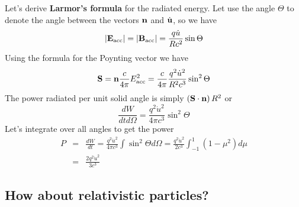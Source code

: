 Let's derive {\bf Larmor's formula} for the radiated energy.  Let use
the angle $\Theta$ to denote the angle between the vectors ${\bf n}$
and $\dot{{\bf u}}$, so we have
\begin{equation}
|{\bf E}_{\hbox{\rm \scriptsize acc}}| = |{\bf B}_{\hbox{\rm \scriptsize acc}}| = \frac{q \dot{u}}{Rc^2}
\sin \Theta
\label{eq:207}
\end{equation}
Using the formula for the Poynting vector we have
\begin{equation}
{\bf S} = {\bf n} \frac{c}{4\pi} E_{\hbox{\rm \scriptsize acc}}^2 = \frac{c}{4\pi}
\frac{q^2 \dot{u}^2}{R^2 c^3} \sin^2 \Theta
\label{eq:208}
\end{equation}
The power radiated per unit solid angle is simply $\left ( {\bf S}\cdot {\bf
  n}\right) R^2$ or
\begin{equation}
\frac{dW}{dt d\Omega} = \frac{q^2 \dot{u}^2}{4\pi c^3} \sin^2 \Theta
\label{eq:209}
\end{equation}
Let's integrate over all angles to get the power
\begin{eqnarray}
P &=& \frac{d W}{d t} = \frac{q^2 \dot{u}^2}{4\pi c^3} \int
\sin^2\Theta d\Omega = \frac{q^2 \dot{u}^2}{2 c^3}\int_{-1}^1 \left (1
- \mu^2 \right ) d \mu  \\
&=& \frac{2 q^2 \dot{u}^2}{3c^3}
\label{eq:210}
\end{eqnarray}

\subsection{How about relativistic particles?}
\label{sec:how-about-relat}

